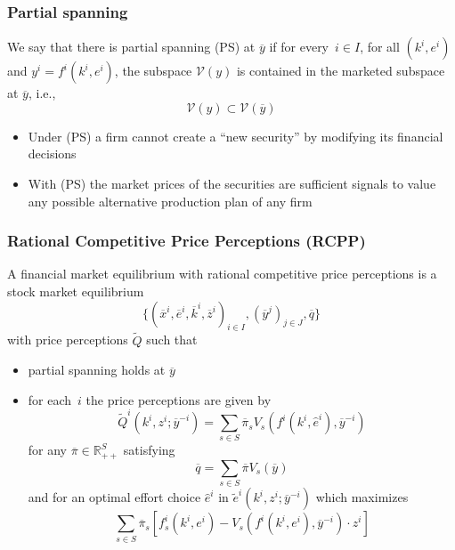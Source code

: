 \documentclass[blue]{beamer}
\def\R{\mathbb{R}}
\theoremstyle{definition}
\theoremstyle{example}
\begin{document}

\begin{frame}\frametitle{Partial spanning}

\begin{definition}
We say that there is \alert{partial spanning} (PS) at $\overline{y}$ if for every~$i\in I$, for all $(k^i,e^i)$ and $y^i = f^i(k^i,e^i)$, the subspace $\mathcal{V}(y)$ is contained in the marketed subspace
at $\overline{y}$, i.e.,
\[
\mathcal{V}(y) \subset \mathcal{V}(\overline{y})
\]
\end{definition}

\begin{itemize}
\item Under (PS) a firm cannot create a ``new security'' by modifying its financial decisions
\item With (PS) the market prices of the securities are sufficient signals to value any possible alternative production plan of any firm
\end{itemize}

\end{frame}



\begin{frame}\frametitle{Rational Competitive Price Perceptions (RCPP)}

\begin{small}
A \alert{financial market equilibrium with rational competitive price perceptions} is a stock market equilibrium
\[
\{(\overline{x}^i,\overline{e}^i,\overline{k}^i,\overline{z}^i)_{i\in I},(\overline{y}^j)_{j\in J},\overline{q}\}
\]
with price perceptions $\widetilde{Q}$ such that
\begin{itemize}
\item partial spanning holds at $\overline{y}$
\item for each~$i$ the price perceptions are given by
\[
\widetilde{Q}^i(k^i,z^i;\overline{y}^{-i}) = \sum_{s\in S} \overline{\pi}_s V_s(f^i(k^i,\widehat{e}^i),\overline{y}^{-i})
\]
for any $\overline{\pi} \in \R^S_{++}$ satisfying
\[
\overline{q} = \sum_{s\in S} \overline{\pi} V_s(\overline{y})
\]
and for an optimal effort choice $\widehat{e}^i$ in $\widetilde{e}^i(k^i,z^i;\overline{y}^{-i})$ which maximizes
\[
\sum_{s\in S} \overline{\pi}_s \left[ f^i_s(k^i,e^i) - V_s(f^i(k^i,e^i),\overline{y}^{-i}) \cdot z^i \right]
\]
\end{itemize}
\end{small}

\end{frame}
\end{document}

